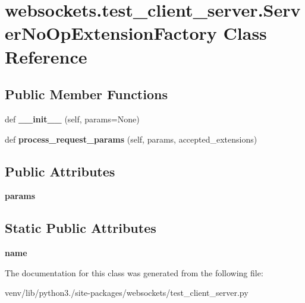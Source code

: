 \hypertarget{classwebsockets_1_1test__client__server_1_1_server_no_op_extension_factory}{}\section{websockets.\+test\+\_\+client\+\_\+server.\+Server\+No\+Op\+Extension\+Factory Class Reference}
\label{classwebsockets_1_1test__client__server_1_1_server_no_op_extension_factory}
\subsection*{Public Member Functions}
\begin{DoxyCompactItemize}
\item 
\mbox{\label{classwebsockets_1_1test__client__server_1_1_server_no_op_extension_factory_a3f70e34cf65ccc2ef50bf1f15aab63bb}} 
def {\bfseries \+\_\+\+\_\+init\+\_\+\+\_\+} (self, params=None)
\item 
\mbox{\label{classwebsockets_1_1test__client__server_1_1_server_no_op_extension_factory_a30f7779f083169be27e2e00e1901cbcb}} 
def {\bfseries process\+\_\+request\+\_\+params} (self, params, accepted\+\_\+extensions)
\end{DoxyCompactItemize}
\subsection*{Public Attributes}
\begin{DoxyCompactItemize}
\item 
\mbox{\label{classwebsockets_1_1test__client__server_1_1_server_no_op_extension_factory_a0568e80d0e6780ee48a4fbe6985d4679}} 
{\bfseries params}
\end{DoxyCompactItemize}
\subsection*{Static Public Attributes}
\begin{DoxyCompactItemize}
\item 
\mbox{\label{classwebsockets_1_1test__client__server_1_1_server_no_op_extension_factory_ab70b6f8cd8d86852fc84f17b601cd0f6}} 
{\bfseries name}
\end{DoxyCompactItemize}


The documentation for this class was generated from the following file\+:\begin{DoxyCompactItemize}
\item 
venv/lib/python3./site-\/packages/websockets/test\+\_\+client\+\_\+server.\+py\end{DoxyCompactItemize}
